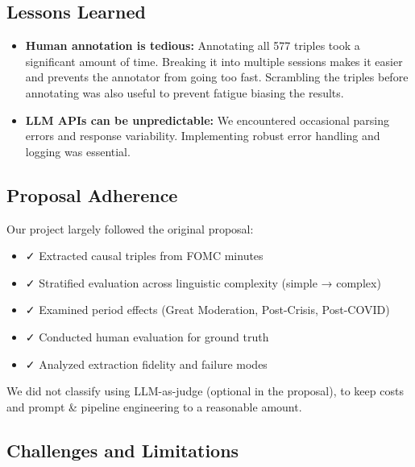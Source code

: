 \documentclass[11pt]{article}
\begin{document}
\subsection{Lessons Learned}
\begin{itemize}
    \item \textbf{Human annotation is tedious:} Annotating all 577 triples took a significant amount of time. Breaking it into multiple sessions makes it easier and prevents the annotator from going too fast. Scrambling the triples before annotating was also useful to prevent fatigue biasing the results.
    \item \textbf{LLM APIs can be unpredictable:} We encountered occasional parsing errors and response variability. Implementing robust error handling and logging was essential.
\end{itemize}

\subsection{Proposal Adherence}

Our project largely followed the original proposal:
\begin{itemize}
    \item ✓ Extracted causal triples from FOMC minutes
    \item ✓ Stratified evaluation across linguistic complexity (simple → complex)
    \item ✓ Examined period effects (Great Moderation, Post-Crisis, Post-COVID)
    \item ✓ Conducted human evaluation for ground truth
    \item ✓ Analyzed extraction fidelity and failure modes
\end{itemize}

We did not classify using LLM-as-judge (optional in the proposal), to keep costs and prompt \& pipeline engineering to a reasonable amount.

\subsection{Challenges and Limitations}
\end{document}
